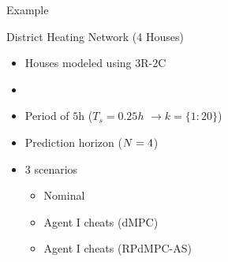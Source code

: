 \documentclass[handout,aspectratio=169]{beamer}
\begin{document}
\begin{frame}{Example}
\begin{minipage}[c]{.35\textwidth}
{\begin{tikzpicture}[node distance=.5cm and .75cm,scale=1]
      \end{tikzpicture}
    }
  \end{minipage}
  \hfill
  \begin{minipage}[c]{.6\textwidth}
    \begin{exampleblock}{District Heating Network (4 Houses)}
      \begin{itemize}
        \item Houses modeled using 3R-2C
        \item {}
        \item Period of ${5} \mathrm{h}$ ($T_{s}=0.25h$ $\to k=\{1\mathbin{:}20\}$)
        \item Prediction horizon ($\predhorz =4$)
        \item 3 scenarios
              \begin{itemize}
                \item[\encircle{N}] Nominal
                \item[\encircle{C}] Agent I cheats (dMPC)
                \item[\encircle{S}] Agent I cheats (RPdMPC-AS)
              \end{itemize}
      \end{itemize}
    \end{exampleblock}
  \end{minipage}
\end{frame}
\end{document}
